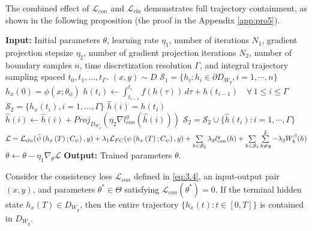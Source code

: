 \documentclass[journal]{IEEEtran}
\begin{document}
The combined effect of $\mathcal{L}_{con}$ and $\mathcal{L}_{cla}$ demonstrates full trajectory containment, as shown in the following proposition (the proof in the Appendix \ref{app:pro5}).
\begin{algorithm*}[t]
	\caption{The Complete Training Algorithm} \label{alg:2}
	\begin{algorithmic}[1]
		\State \textbf{Input:} Initial parameters $\theta$, learning rate $\eta_{1}$, number of iterations $N_{1}$, gradient projection stepsize $\eta_{2}$, number of gradient projection iterations $N_{2}$, number of boundary samples $n$,  time discretization resolution $\Gamma$, and  integral trajectory sampling spaced $t_0, t_1, \ldots, t_\Gamma$.
		\State $(x, y) \sim D$  
		\State  $\mathcal{S}_1 = \{h_i:h_i\in \partial D_{W_y}, i=1,\cdots,n \}$  
		\State $h_x(0)=\phi \left( {x;{\theta _\phi }} \right)$  
		\State $h(t_i) \leftarrow \int_{t_{i-1}}^{t_i} f(h(\tau)) \, d\tau + h(t_{i-1}) \quad \forall \, 1 \le i \le \Gamma$ 
		\State $\mathcal{S}_2 = \{h_x(t_i), i=1,\dots,\Gamma \}$
		\State $\hat{h}(i)=h(t_{i})$ 
		\State ${\hat{h}(i)} \leftarrow {\hat{h}(i)} + {Proj}_{D_{W_y}}( \eta_{2}{\nabla} l_{con}^y(\hat{h}(i))  )$ 
		\EndFor
		\EndFor
		\State $\mathcal{S}_2=\mathcal{S}_2 \cup \{\hat{h}(t_i):i=1,\cdots,\Gamma \}$ 
		\State $\mathcal{L} = {\mathcal{L}_{cla}}(\tilde  \psi \left( {h_{x}\left( T \right);{C _\psi }} \right),y) + {\lambda _1}{\mathcal{L}_{FC}}( \psi \left( {h_{x}\left( T \right);{C _\psi }} \right),y) + \sum\limits_{h \in {{\mathcal{S}}_{\rm{2}}}} {{\lambda _2}l_{con}^y(h)} + \sum\limits_{h \in {\mathcal{S}_1}} {\sum\limits_{k \ne y}^L -\lambda_3{W_k^\beta(h)} } $  
		\State $\theta  \leftarrow \theta  - {\eta _1}{\nabla _\theta }\mathcal{L}$  
		\EndFor
		\State \textbf{Output:} Trained parameters $\theta$.
	\end{algorithmic}
	
\end{algorithm*}

\begin{proposition} \label{propos:4}
	Consider the consistency loss $\mathcal{L}_{con}$ defined in \eqref{eq:3.4}, an input-output pair $(x,y)$, and parameters $\theta^* \in \Theta$ satisfying $\mathcal{L}_{con}(\theta^*) = 0$. If the terminal hidden state $h_x(T) \in D_{W_y}$, then the entire trajectory $\{h_x(t) : t \in [0,T]\}$ is contained in $D_{W_y}$. 
\end{proposition}
\end{document}
